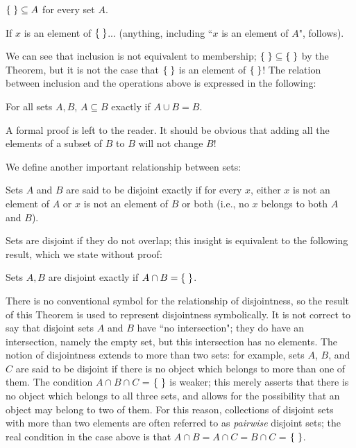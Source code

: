 \begin{thm}
 $\mbox{$\{\;\}$} \subseteq A$ for every set $A$.
\end{thm}

\preuve If $x$ is an element of $\mbox{$\{\;\}$}$... (anything, including ``$x$ is an
element of $A$", follows).\finpreuve

We can see that inclusion is not equivalent to
membership; $\mbox{$\{\;\}$} \subseteq \mbox{$\{\;\}$}$ by the Theorem, but it is
not the case that $\mbox{$\{\;\}$}$ is an element of $\mbox{$\{\;\}$}$!  The relation between
inclusion and the operations above is expressed in the following:

\begin{thm}
 For all sets $A,B$, $A \subseteq B$ exactly if  $A \cup B  =  B$.
\end{thm}

A formal proof is left to the reader.  It should be obvious that
adding all the elements of a subset of $B$ to $B$ will not change
$B$!

We define another important relationship between sets:

\begin{definition}
 Sets $A$ and $B$ are said to be {\upshape disjoint\/} exactly
 if for every $x$, either $x$ is not an element of $A$ or $x$ is not an element
 of $B$ or both (i.e., no $x$ belongs to both $A$ and $B$).
\end{definition}

Sets are disjoint if they do not overlap; this insight is
equivalent to the following result, which we state without proof:

\begin{thm}
 Sets $A, B$ are disjoint exactly if  $A \cap B  =  \mbox{$\{\;\}$}$.
\end{thm}

There is no conventional symbol for the relationship of
disjointness, so the result of this Theorem is used to represent
disjointness symbolically.  It is not correct to say that disjoint
sets $A$ and $B$ have ``no intersection"; they do
have an intersection, namely the empty set, but this
intersection has no elements.  The notion of disjointness
extends to more than two sets:
for example, sets $A$, $B$, and $C$ are said to be disjoint if there
is no object which belongs to more than one of them.  The condition $A
\cap B \cap C$ = $\mbox{$\{\;\}$}$ is weaker; this merely asserts that there is
no object which belongs to all three sets, and allows for the
possibility that an object may belong to two of them.  For this
reason, collections of disjoint sets with more than two elements are
often referred to as {\itshape pairwise\/} disjoint
sets;
the real condition in the case above is that $A \cap B = A \cap C = B \cap C$ =
$\mbox{$\{\;\}$}$.

